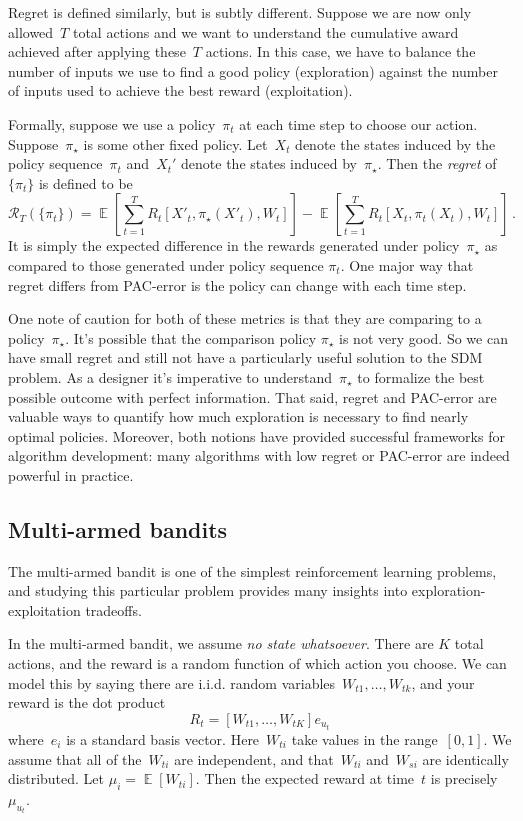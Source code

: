 \documentclass{tufte-book}
\begin{document}
Regret is defined similarly, but is subtly different. Suppose we are now
only allowed~\(T\) total actions and we want to understand the
cumulative award achieved after applying these~\(T\) actions. In this
case, we have to balance the number of inputs we use to find a good
policy (exploration) against the number of inputs used to achieve the
best reward (exploitation).

Formally, suppose we use a policy~\(\pi_t\) at each time step to choose
our action. Suppose~\(\pi_\star\) is some other fixed policy.
Let~\(X_t\) denote the states induced by the policy sequence~\(\pi_t\)
and~\(X_t'\) denote the states induced by~\(\pi_\star\). Then the
\emph{regret} of \(\{\pi_t\}\) is defined to be \[
    \mathcal{R}_T(\{\pi_t\}) = \mathop\mathbb{E}\left[\sum_{t=1}^T R_t[X'_t,\pi_\star(X'_t),W_t]\right]-\mathop\mathbb{E}\left[\sum_{t=1}^T R_t[X_t,\pi_t(X_t),W_t]\right]\,.
\] It is simply the expected difference in the rewards generated under
policy~\(\pi_\star\) as compared to those generated under policy
sequence \(\pi_t\). One major way that regret differs from PAC-error is
the policy can change with each time step.

One note of caution for both of these metrics is that they are comparing
to a policy~\(\pi_\star\). It's possible that the comparison policy
\(\pi_\star\) is not very good. So we can have small regret and still
not have a particularly useful solution to the SDM problem. As a
designer it's imperative to understand~\(\pi_\star\) to formalize the
best possible outcome with perfect information. That said, regret and
PAC-error are valuable ways to quantify how much exploration is
necessary to find nearly optimal policies. Moreover, both notions have
provided successful frameworks for algorithm development: many
algorithms with low regret or PAC-error are indeed powerful in practice.

\hypertarget{multi-armed-bandits}{%
\subsection{Multi-armed bandits}\label{multi-armed-bandits}}

The multi-armed bandit is one of the simplest reinforcement learning
problems, and studying this particular problem provides many insights
into exploration-exploitation
tradeoffs.

In the multi-armed bandit, we assume \emph{no state whatsoever}. There
are \(K\) total actions, and the reward is a random function of which
action you choose. We can model this by saying there are i.i.d. random
variables~\(W_{t1},\ldots, W_{tk}\), and your reward is the dot product
\[
    R_t = [W_{t1},\ldots, W_{tK}] e_{u_t}
\] where~\(e_i\) is a standard basis vector. Here~\(W_{ti}\) take values
in the range~\([0,1]\). We assume that all of the~\(W_{ti}\) are
independent, and that~\(W_{ti}\) and~\(W_{si}\) are identically
distributed. Let \(\mu_{i} = \mathop\mathbb{E}[W_{ti}]\). Then the
expected reward at time~\(t\) is precisely~\(\mu_{u_t}\).
\end{document}
